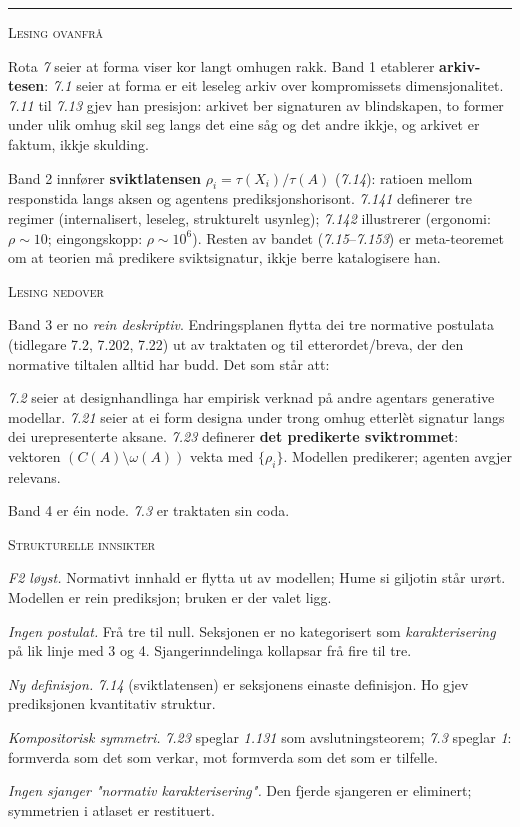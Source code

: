 \documentclass[a4paper,landscape,9pt]{article}
\begin{document}
\vspace{-0.2em}

\hrule

\vspace{0.4em}

\begin{minipage}[t]{0.325\textwidth}
{\scshape\small Lesing ovanfrå}

Rota \emph{7} seier at forma viser kor langt omhugen rakk. Band 1 etablerer \textbf{arkiv-tesen}: \emph{7.1} seier at forma er eit leseleg arkiv over kompromissets dimensjonalitet. \emph{7.11} til \emph{7.13} gjev han presisjon: arkivet ber signaturen av blindskapen, to former under ulik omhug skil seg langs det eine såg og det andre ikkje, og arkivet er faktum, ikkje skulding.

Band 2 innfører \textbf{sviktlatensen} $\rho_i = \tau(X_i)/\tau(A)$ (\emph{7.14}): ratioen mellom responstida langs aksen og agentens prediksjonshorisont. \emph{7.141} definerer tre regimer (internalisert, leseleg, strukturelt usynleg); \emph{7.142} illustrerer (ergonomi: $\rho\sim 10$; eingongskopp: $\rho\sim 10^6$). Resten av bandet (\emph{7.15}--\emph{7.153}) er meta-teoremet om at teorien må predikere sviktsignatur, ikkje berre katalogisere han.
\end{minipage}\hfill
\begin{minipage}[t]{0.325\textwidth}
{\scshape\small Lesing nedover}

Band 3 er no \emph{rein deskriptiv}. Endringsplanen flytta dei tre normative postulata (tidlegare 7.2, 7.202, 7.22) ut av traktaten og til etterordet/breva, der den normative tiltalen alltid har budd. Det som står att:

\emph{7.2} seier at designhandlinga har empirisk verknad på andre agentars generative modellar. \emph{7.21} seier at ei form designa under trong omhug etterlèt signatur langs dei urepresenterte aksane. \emph{7.23} definerer \textbf{det predikerte sviktrommet}: vektoren $(C(A)\setminus\omega(A))$ vekta med $\{\rho_i\}$. Modellen predikerer; agenten avgjer relevans.

Band 4 er éin node. \emph{7.3} er traktaten sin coda.
\end{minipage}\hfill
\begin{minipage}[t]{0.325\textwidth}
{\scshape\small Strukturelle innsikter}

\emph{F2 løyst.} Normativt innhald er flytta ut av modellen; Hume si giljotin står urørt. Modellen er rein prediksjon; bruken er der valet ligg.

\emph{Ingen postulat.} Frå tre til null. Seksjonen er no kategorisert som \emph{karakterisering} på lik linje med 3 og 4. Sjangerinndelinga kollapsar frå fire til tre.

\emph{Ny definisjon.} \emph{7.14} (sviktlatensen) er seksjonens einaste definisjon. Ho gjev prediksjonen kvantitativ struktur.

\emph{Kompositorisk symmetri.} \emph{7.23} speglar \emph{1.131} som avslutningsteorem; \emph{7.3} speglar \emph{1}: formverda som det som verkar, mot formverda som det som er tilfelle.

\emph{Ingen sjanger "normativ karakterisering".} Den fjerde sjangeren er eliminert; symmetrien i atlaset er restituert.
\end{minipage}
\end{document}
